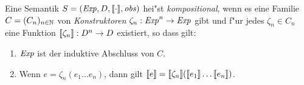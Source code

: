 \documentclass[12pt,a4paper]{article}
\begin{document}
\begin{definition}[Kompositionalit"at]
  Eine Semantik $S=(\mathit{Exp},D,[\![\cdot]\!],\mathit{obs})$ hei"st \emph{kompositional}, wenn es eine
  Familie $C = (C_n)_{n\in\mathbb N}$ von \emph{Konstruktoren}
  $\zeta_n:\mathit{Exp}^n \to \mathit{Exp}$ gibt und f"ur jedes $\zeta_n \in C_n$ eine
  Funktion $[\![\zeta_n]\!]: D^n \to D$ existiert, so dass gilt:
  \begin{enumerate}
  \item $\mathit{Exp}$ ist der induktive Abschluss von $C$.
  \item Wenn $e = \zeta_n (e_1 \ldots e_n)$, dann gilt
    $\semantic{e} = \semantic{\zeta_n}(\semantic{e_1} \ldots \semantic{e_n})$.
  \end{enumerate}
\end{definition}
\end{document}
